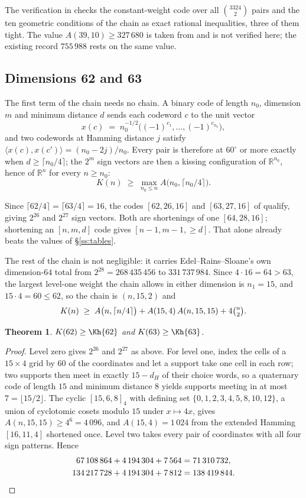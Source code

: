 \documentclass[11pt]{amsart}
\newtheorem{theorem}{Theorem}[section]
\theoremstyle{remark}
\newcommand{\ip}[2]{\langle #1,#2\rangle}
\newcommand{\R}{\mathbb{R}}
\begin{document}
The verification in \cite{repo} checks the constant-weight code over all
$\binom{3324}{2}$ pairs and the ten geometric conditions of the chain as exact
rational inequalities, three of them tight. The value $A(39,10)\ge327\,680$ is
taken from \cite{zinoviev-litsyn1984} and is not verified here; the existing
record $755\,988$ rests on the same value.

\subsection{Dimensions 62 and 63}\label{ss:d6263}

The first term of the chain needs no chain. A binary code of length $n_0$, dimension
$m$ and minimum distance $d$ sends each codeword $c$ to the unit vector
\[
  x(c)\;=\; n_0^{-1/2}\bigl((-1)^{c_1},\dots,(-1)^{c_{n_0}}\bigr),
\]
and two codewords at Hamming distance $j$ satisfy
$\ip{x(c)}{x(c')}=(n_0-2j)/n_0$. Every pair is therefore at $60^\circ$ or more
exactly when $d\ge\lceil n_0/4\rceil$; the $2^m$ sign vectors are then a
kissing configuration of $\R^{n_0}$, hence of $\R^n$ for every $n\ge n_0$:
\[
  K(n)\;\ge\; \max_{n_0\le n} A\bigl(n_0,\lceil n_0/4\rceil\bigr).
\]

Since $\lceil 62/4\rceil=\lceil 63/4\rceil=16$, the codes $[62,26,16]$ and
$[63,27,16]$ of \cite{codetables} qualify, giving $2^{26}$ and $2^{27}$ sign
vectors. Both are shortenings of one $[64,28,16]$; shortening an $[n,m,d]$ code
gives $[n-1,m-1,\ge d]$. That alone already beats the values of \S\ref{ss:tables}.

The rest of the chain is not negligible: it carries Edel--Rains--Sloane's own
dimension-$64$ total from $2^{28}=268\,435\,456$ to $331\,737\,984$. Since
$4\cdot16=64>63$, the largest level-one weight the chain allows in either dimension
is $n_1=15$, and $15\cdot4=60\le62$, so the chain is $(n,15,2)$ and
\[
  K(n)\;\ge\;A\bigl(n,\lceil n/4\rceil\bigr)+A(15,4)\,A(n,15,15)+4\tbinom{n}{2}.
\]

\begin{theorem}\label{thm:6263}
$K(62)\ge\Kh{62}$ and $K(63)\ge\Kh{63}$.
\end{theorem}

\begin{proof}
Level zero gives $2^{26}$ and $2^{27}$ as above. For level one, index the cells of a
$15\times4$ grid by $60$ of the coordinates and let a support take one cell in each
row; two supports then meet in exactly $15-d_H$ of their choice words, so a
quaternary code of length $15$ and minimum distance $8$ yields supports meeting in
at most $7=\lfloor15/2\rfloor$. The cyclic $[15,6,8]_4$ with defining set
$\{0,1,2,3,4,5,8,10,12\}$, a union of cyclotomic cosets modulo $15$ under
$x\mapsto4x$, gives $A(n,15,15)\ge4^6=4\,096$, and $A(15,4)=1\,024$ from the
extended Hamming $[16,11,4]$ shortened once. Level two takes every pair of
coordinates with all four sign patterns. Hence
\begin{align*}
  67\,108\,864+4\,194\,304+7\,564 &= 71\,310\,732,\\
  134\,217\,728+4\,194\,304+7\,812 &= 138\,419\,844 . \qedhere
\end{align*}
\end{proof}
\end{document}
